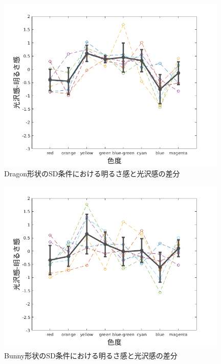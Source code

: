             \newpage
            \begin{figure}[h]
                \centering
                \includegraphics[width=11.0cm]{./img/ex4_DSD.png}
                \caption{Dragon形状のSD条件における明るさ感と光沢感の差分}
                \label{ex4_DSD}
            \end{figure}

            \begin{figure}[h]
                \centering
                \includegraphics[width=11.0cm]{./img/ex4_BSD.png}
                \caption{Bunny形状のSD条件における明るさ感と光沢感の差分}
                \label{ex4_BSD}
            \end{figure}
            
